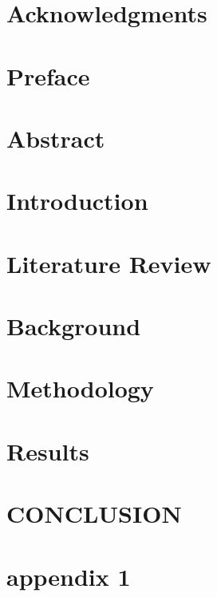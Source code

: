 \documentclass[12pt, twoside, openright]{report}
\begin{document}
	
	
	
	\chapter*{Acknowledgments}
	
	\newpage
	
	\chapter*{Preface}
	
	
	\chapter*{Abstract}
	
	
	\tableofcontents
	\listoffigures
	\listoftables
	
	\chapter{Introduction}
	
	
	\chapter{Literature Review}
	
	
	\chapter{Background}
	
	
	\chapter{Methodology}
	
	
	\chapter{Results}
	
	
	\chapter{CONCLUSION}
	
	
	\appendix
	\chapter{appendix 1}
	
	
	
	
\end{document}
